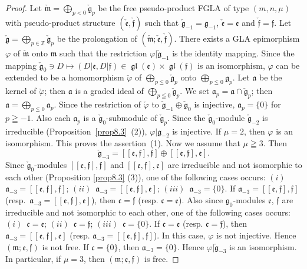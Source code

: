 \documentclass[11pt]{article}
\numberwithin{equation}{section}
\numberwithin{theorem}{section}
\numberwithin{proposition}{section}
\numberwithin{lemma}{section}
\numberwithin{corollary}{section}
\numberwithin{definition}{section}
\numberwithin{example}{section}
\numberwithin{remark}{section}
\numberwithin{note}{section}
\newcommand{\gl}{\operatorname{\mathfrak{gl}}}
\begin{document}
\begin{proof}
Let
$\check{\mathfrak m}=\bigoplus_{p<0}\limits\check{\mathfrak g}_p$
be the free pseudo-product FGLA of type $(m,n,\mu)$
with pseudo-product structure
$(\check{\mathfrak e},\check{\mathfrak f})$ such that
$\check{\mathfrak g}_{-1}=\mathfrak g_{-1}$,
$\check{\mathfrak e}=\mathfrak e$ and $\check{\mathfrak f}=\mathfrak f$.
Let $\check{\mathfrak g}=\bigoplus_{p\in\mathbb Z}\limits\check{\mathfrak g}_p$  be the prolongation of $(\check{\mathfrak m};\check{\mathfrak e},\check{\mathfrak f})$.
There exists a GLA epimorphism $\varphi$
of $\check{\mathfrak m}$ onto $\mathfrak m$ such that the restriction
$\varphi|\check{\mathfrak g}_{-1}$ is the identity mapping.
Since the mapping
$\check{\mathfrak g}_0\ni D\mapsto
(D|\mathfrak e,D|\mathfrak f)\in\gl(\mathfrak e)\times\gl(\mathfrak f)$
is an isomorphism,
$\varphi$ can be extended to be a homomorphism $\check{\varphi}$
of $\bigoplus\limits_{p\leqq0}\check{\mathfrak g}_{p}$ onto
$\bigoplus\limits_{p\leqq0}\mathfrak g_p$.
Let $\mathfrak a$ be the kernel of $\check{\varphi}$;
then $\mathfrak a$ is a graded ideal of
$\bigoplus\limits_{p\leqq0}\check{\mathfrak g}_{p}$.
We set $\mathfrak a_p
=\mathfrak a\cap \check{\mathfrak g}_{p}$; then
$\mathfrak a=\bigoplus\limits_{p\leqq 0}\mathfrak a_p$.
Since the restriction of $\check{\varphi}$ to
$\check{\mathfrak g}_{-1}\oplus \check{\mathfrak g}_0$ is injective,
$\mathfrak a_p=\{0\}$ for $p\geqq-1$. Also
each $\mathfrak a_p$ is a $\check{\mathfrak g}_0$-submodule of
$\check{\mathfrak g}_p$.
Since the $\check{\mathfrak g}_0$-module
$\check{\mathfrak g}_{-2}$ is irreducible (Proposition~\ref{prop8.3}~(2)),
$\varphi|\mathfrak g_{-2}$ is injective.
If $\mu=2$, then $\varphi$ is an isomorphism. This proves the assertion~(1).
Now we assume that $\mu\geqq3$. Then
\[
\check{\mathfrak g}_{-3}=[[\mathfrak e,\mathfrak f],\mathfrak f]\oplus
[[\mathfrak e,\mathfrak f],\mathfrak e].
\]
Since $\check{\mathfrak g}_0$-modules
$[[\mathfrak e,\mathfrak f],\mathfrak f]$ and
$[[\mathfrak e,\mathfrak f],\mathfrak e]$ are irreducible and not isomorphic
to each other (Proposition \ref{prop8.3} (3)),
one of the following cases occurs:
$(i)$~$\mathfrak a_{-3}=[[\mathfrak e,\mathfrak f],\mathfrak f]$;
$(ii)$~$\mathfrak a_{-3}=[[\mathfrak e,\mathfrak f],\mathfrak e]$;
$(iii)$~$\mathfrak a_{-3}=\{0\}$.
If $\mathfrak a_{-3}=[[\mathfrak e,\mathfrak f],\mathfrak f]$ (resp.\
$\mathfrak a_{-3}=[[\mathfrak e,\mathfrak f],\mathfrak e]$), then
$\mathfrak c=\mathfrak f$
(resp. $\mathfrak c=\mathfrak e$).
Also
since $\mathfrak g_0$-modules
$\mathfrak e$,
$\mathfrak f$ are irreducible and not isomorphic to each other,
one of the following cases occurs:
$(i)$~$\mathfrak c=\mathfrak e$;
$(ii)$~$\mathfrak c=\mathfrak f$;
$(iii)$~$\mathfrak c=\{0\}$.
If $\mathfrak c=\mathfrak e$
(resp. $\mathfrak c=\mathfrak f$),
then $\mathfrak a_{-3}=[[\mathfrak e,\mathfrak f],\mathfrak e]$
(resp. $\mathfrak a_{-3}=[[\mathfrak e,\mathfrak f],\mathfrak f]$).
In this case, $\varphi$ is not injective.
Hence $(\mathfrak m;\mathfrak e,\mathfrak f)$ is not free.
If $\mathfrak c=\{0\}$,
then $\mathfrak a_{-3}=\{0\}$.
Hence $\varphi|\check{\mathfrak g}_{-3}$ is an isomorphism.
In particular, if $\mu=3$, then
$(\mathfrak m;\mathfrak e,\mathfrak f)$ is free.
\end{proof}
\end{document}
